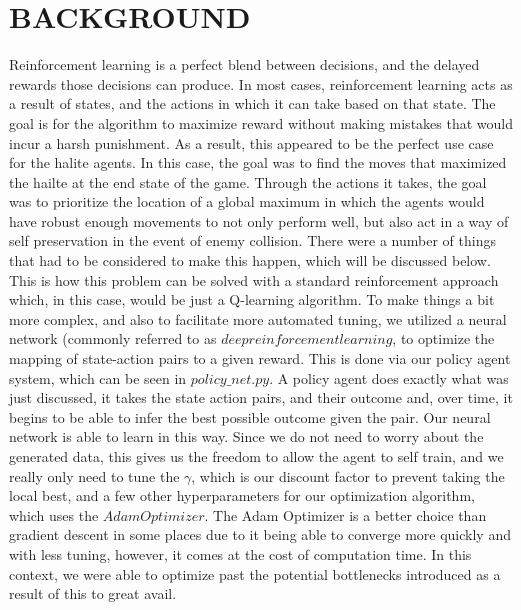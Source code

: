 \documentclass[letterpaper, 11 pt, conference]{ieeeconf}
\begin{document}
\section{BACKGROUND}
Reinforcement learning is a perfect blend between decisions, and the delayed rewards those decisions can produce. In most cases, reinforcement learning acts as a result of states, and the actions in which it can take based on that state. The goal is for the algorithm to maximize reward without making mistakes that would incur a harsh punishment. As a result, this appeared to be the perfect use case for the halite agents. In this case, the goal was to find the moves that maximized the hailte at the end state of the game. Through the actions it takes, the goal was to prioritize the location of a global maximum in which the agents would have robust enough movements to not only perform  well, but also act in a way of self preservation in the event of enemy collision. There were a number of things that had to be considered to make this happen, which will be discussed below. This is how this problem can be solved with a standard reinforcement approach which, in this case, would be just a Q-learning algorithm. To make things a bit more complex, and also to facilitate more automated tuning, we utilized a neural network (commonly referred to as $deep reinforcement learning$, to optimize the mapping of state-action pairs to a given reward. This is done via our policy agent system, which can be seen in $policy\_net.py$. A policy agent does exactly what was just discussed, it takes the state action pairs, and their outcome and, over time, it begins to be able to infer the best possible outcome given the pair. Our neural network is able to learn in this way. Since we do not need to worry about the generated data, this gives us the freedom to allow the agent to self train, and we really only need to tune the $\gamma$, which is our discount factor to prevent taking the local best, and a few other hyperparameters for our optimization algorithm, which uses the $Adam Optimizer$. The Adam Optimizer is a better choice than gradient descent in some places due to it being able to converge more quickly and with less tuning, however, it comes at the cost of computation time. In this context, we were able to optimize past the potential bottlenecks introduced as a result of this to great avail.
\end{document}

